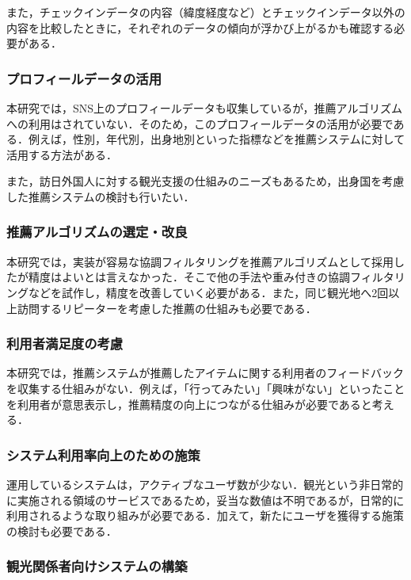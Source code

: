 \documentclass{jsarticle}
\begin{document}
また，チェックインデータの内容（緯度経度など）とチェックインデータ以外の内容を比較したときに，それぞれのデータの傾向が浮かび上がるかも確認する必要がある．

\subsubsection{プロフィールデータの活用}

本研究では，SNS上のプロフィールデータも収集しているが，推薦アルゴリズムへの利用はされていない．そのため，このプロフィールデータの活用が必要である．例えば，性別，年代別，出身地別といった指標などを推薦システムに対して活用する方法がある．

また，訪日外国人に対する観光支援の仕組みのニーズもあるため，出身国を考慮した推薦システムの検討も行いたい．

\subsubsection{推薦アルゴリズムの選定・改良}

本研究では，実装が容易な協調フィルタリングを推薦アルゴリズムとして採用したが精度はよいとは言えなかった．そこで他の手法や重み付きの協調フィルタリングなどを試作し，精度を改善していく必要がある．また，同じ観光地へ2回以上訪問するリピーターを考慮した推薦の仕組みも必要である．

\subsubsection{利用者満足度の考慮}

本研究では，推薦システムが推薦したアイテムに関する利用者のフィードバックを収集する仕組みがない．例えば，「行ってみたい」「興味がない」といったことを利用者が意思表示し，推薦精度の向上につながる仕組みが必要であると考える．

\subsubsection{システム利用率向上のための施策}

運用しているシステムは，アクティブなユーザ数が少ない．観光という非日常的に実施される領域のサービスであるため，妥当な数値は不明であるが，日常的に利用されるような取り組みが必要である．加えて，新たにユーザを獲得する施策の検討も必要である．

\subsubsection{観光関係者向けシステムの構築}
\end{document}

